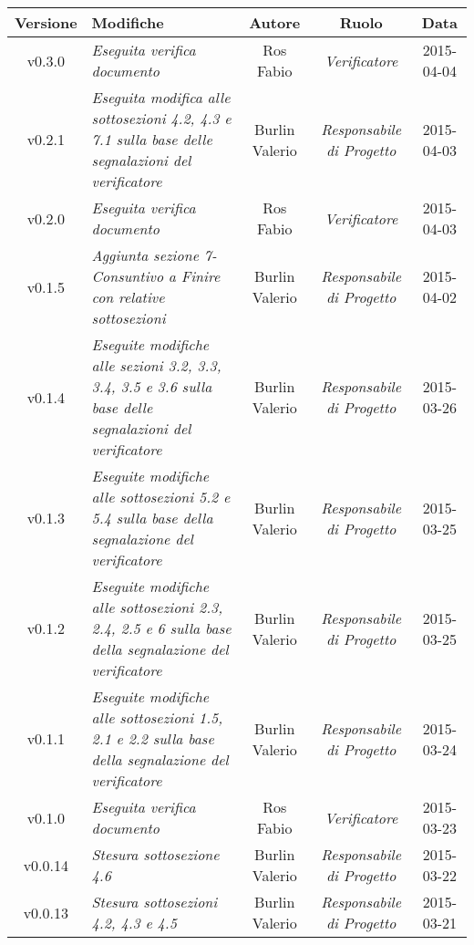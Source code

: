 \newpage

\begin{table}[h]
\centering
\begin{tabular}{|c|p{}|c|c|c|}
	\toprule
		\textbf{Versione} & \textbf{Modifiche} & \textbf{Autore} & \textbf{Ruolo} & \textbf{Data}\\
	\midrule
	\midrule
		v0.3.0 & \textit{Eseguita verifica documento} & Ros Fabio & \textit{Verificatore} & 2015-04-04\\
	\midrule
		v0.2.1 & \textit{Eseguita modifica alle sottosezioni 4.2, 4.3 e 7.1 sulla base delle segnalazioni del verificatore} & Burlin Valerio & \textit{Responsabile di Progetto} & 2015-04-03\\
	\midrule
		v0.2.0 & \textit{Eseguita verifica documento} & Ros Fabio & \textit{Verificatore} & 2015-04-03\\
	\midrule
		v0.1.5 & \textit{Aggiunta sezione 7-Consuntivo a Finire con relative sottosezioni} & Burlin Valerio & \textit{Responsabile di Progetto} & 2015-04-02\\
	\midrule
		v0.1.4 & \textit{Eseguite modifiche alle sezioni 3.2, 3.3, 3.4, 3.5 e 3.6 sulla base delle segnalazioni del verificatore} & Burlin Valerio & \textit{Responsabile di Progetto} & 2015-03-26\\
	\midrule
		v0.1.3 & \textit{Eseguite modifiche alle sottosezioni 5.2 e 5.4 sulla base della segnalazione del verificatore} & Burlin Valerio & \textit{Responsabile di Progetto} & 2015-03-25\\
	\midrule
		v0.1.2 & \textit{Eseguite modifiche alle sottosezioni 2.3, 2.4, 2.5 e 6 sulla base della segnalazione del verificatore} & Burlin Valerio & \textit{Responsabile di Progetto} & 2015-03-25\\
	\midrule
		v0.1.1 & \textit{Eseguite modifiche alle sottosezioni 1.5, 2.1 e 2.2 sulla base della segnalazione del verificatore} & Burlin Valerio & \textit{Responsabile di Progetto} & 2015-03-24\\
	\midrule
		v0.1.0 & \textit{Eseguita verifica documento} & Ros Fabio & \textit{Verificatore} & 2015-03-23\\
	\midrule
		v0.0.14 & \textit{Stesura sottosezione 4.6} & Burlin Valerio & \textit{Responsabile di Progetto} & 2015-03-22\\
	\midrule
		v0.0.13 & \textit{Stesura sottosezioni 4.2, 4.3 e 4.5} & Burlin Valerio & \textit{Responsabile di Progetto} & 2015-03-21\\
	\bottomrule
\end{tabular}
\end{table}

